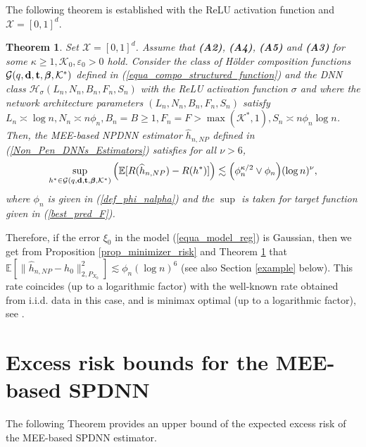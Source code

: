 \documentclass[10pt,twoside]{article}
\numberwithin{equation}{section}
\newtheorem{thm}{Theorem}[section]
\newcommand{\E}{\ensuremath{\mathbb{E}}}
\newcommand{\mk}{ { \mathcal{K}} }
\begin{document}
\noindent
The following theorem is established with the ReLU activation function  and $\mathcal{X} = [0,1]^d$.
%
%
\begin{thm}\label{excess_risk_bound__expo_strong_mixing_thm1_v2}
%
Set $\mathcal{X} = [0,1]^d$. Assume that \textbf{(A2)}, \textbf{(A4)}, \textbf{(A5)} and  \textbf{(A3)} for some $\kappa \ge 1, \mk_0 , \varepsilon_0 > 0$ hold.
%
Consider the class of H\"older composition functions  $ \mathcal{G}(q, \bold{d}, \bold{t}, \boldsymbol{\beta}, \mk^{*})$ defined in (\ref{equa_compo_structured_function}) and the DNN class $\mathcal{H}_{\sigma}(L_n, N_n, B_n, F_n, S_n)$ with the ReLU activation function $\sigma$ and where the network architecture parameters $(L_n, N_n, B_n, F_n, S_n)$ satisfy $L_n\asymp \log n, N_n \asymp n \phi_n, B_n = B \geq 1 , F_n = F > \max(\mathcal{K}^{*}, 1), S_n \asymp n \phi_n \log n$.
Then, the MEE-based NPDNN estimator $\widehat{h}_{n,NP}$ defined in (\ref{Non_Pen_DNNs_Estimators}) satisfies for all $\nu > 6$, 
%
\begin{align}
\sup_{h^{*} \in \mathcal{G}(q, \bold{d}, \bold{t}, \boldsymbol{\beta}, \mk^{*}) } \Big(  \E[R(\widehat{h}_{n,NP}) - R(h^{*})] \Big)  \lesssim \Big(\phi_{n}^{\kappa/2} \lor \phi_n \Big) (\log n)^{\nu}, 
\end{align}
%
where $\phi_n$ is given in (\ref{def_phi_nalpha}) and the $\sup$ is taken for target function given in (\ref{best_pred_F}). 
\end{thm}
 \noindent
 Therefore, if the error $\xi_0$ in the model (\ref{equa_model_reg}) is Gaussian, then we get from Proposition \ref{prop_minimizer_risk} and Theorem \ref{excess_risk_bound__expo_strong_mixing_thm1_v2} that   $\E[ \| \widehat{h}_{n,NP} - h_0\|_{2, P_{X_0}}^2 ] \lesssim  \phi_n (\log n)^{6}$ (see also Section \ref{example} below).
 This rate coincides (up to a logarithmic factor) with the well-known rate obtained from i.i.d. data in this case, and is minimax optimal (up to a logarithmic factor), see \cite{schmidt2020nonparametric}.
 
  

\section{Excess risk bounds for the MEE-based SPDNN}\label{excess_risk_SPDNN}

The following Theorem provides an upper bound of the expected excess risk of the MEE-based SPDNN estimator.
%
\end{document}
